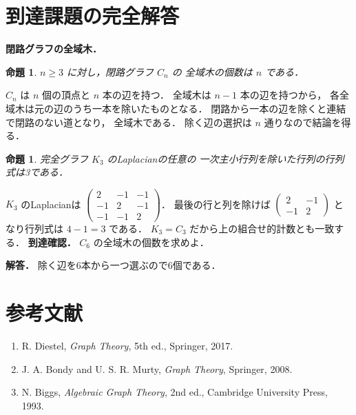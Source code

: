 \documentclass[a5paper,10pt,onecolumn]{jsarticle}
\makeatletter
\theoremstyle{mathnotetheorem}
\newtheorem{proposition}[theorem]{命題}
\renewcommand{\proofname}{証明}
\renewenvironment{proof}[1][\proofname]{%
  \par\pushQED{\qed}\normalfont\topsep4\p@\@plus2\p@\relax
  \trivlist\item[\hskip\labelsep\bfseries #1]\ignorespaces
}{\popQED\endtrivlist\@endpefalse}
\makeatother
\begin{document}
\section{到達課題の完全解答}
\noindent\textbf{閉路グラフの全域木．}
\begin{proposition}
$n\ge3$ に対し，閉路グラフ $C_n$ の
全域木の個数は $n$ である．
\end{proposition}
\begin{proof}
$C_n$ は $n$ 個の頂点と $n$ 本の辺を持つ．
全域木は $n-1$ 本の辺を持つから，
各全域木は元の辺のうち一本を除いたものとなる．
閉路から一本の辺を除くと連結で閉路のない道となり，
全域木である．
除く辺の選択は $n$ 通りなので結論を得る．
\end{proof}
\begin{proposition}
完全グラフ $K_3$ のLaplacianの任意の
一次主小行列を除いた行列の行列式は3である．
\end{proposition}
\begin{proof}
$K_3$ のLaplacianは
$\left(\begin{smallmatrix}
2&-1&-1\\-1&2&-1\\-1&-1&2
\end{smallmatrix}\right)$．
最後の行と列を除けば
$\left(\begin{smallmatrix}2&-1\\-1&2\end{smallmatrix}\right)$
となり行列式は $4-1=3$ である．
$K_3=C_3$ だから上の組合せ的計数とも一致する．
\end{proof}
\noindent\textbf{到達確認．}
$C_6$ の全域木の個数を求めよ．
\par\noindent\textbf{解答．}
除く辺を6本から一つ選ぶので6個である．
\section*{参考文献}
\begin{enumerate}
\item R. Diestel, \textit{Graph Theory}, 5th ed., Springer, 2017.
\item J. A. Bondy and U. S. R. Murty, \textit{Graph Theory}, Springer, 2008.
\item N. Biggs, \textit{Algebraic Graph Theory}, 2nd ed., Cambridge University Press, 1993.
\end{enumerate}
\end{document}
